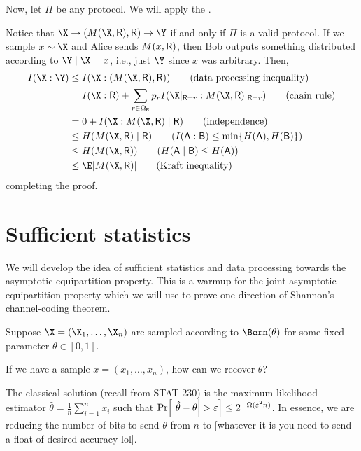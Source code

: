 \documentclass[class=co432,notes,tikz]{agony}
\begin{document}
\begin{prf}
  Now, let $\Pi$ be any protocol.
  We will apply the .

  Notice that $\X \to (M(\X,\rv R),\rv R) \to \Y$ if and only if $\Pi$
  is a valid protocol.
  If we sample $x\sim\X$ and Alice sends $M(x,\mathsf R)$,
  then Bob outputs something distributed according to $\Y \mid \X=x$,
  i.e., just $\Y$ since $x$ was arbitrary. Then,
  \begin{align*}
    I(\X : \Y)
     & \leq I(\X : (M(\X,\rv R),\rv R)) \tag{data processing inequality}                                          \\
     & = I(\X : \rv R) + \sum_{r\in\Omega_{\rv R}} p_r I(\X|_{\rv R=r} : M(\X,\rv R)|_{\rv R=r}) \tag{chain rule} \\
     & = 0 + I(\X : M(\X,\rv R) \mid \rv R) \tag{independence}                                                    \\
     & \leq H(M(\X,\rv R) \mid \rv R) \tag{$I(\rv A : \rv B) \leq \min\{H(\rv A),H(\rv B)\}$}                     \\
     & \leq H(M(\X,\rv R)) \tag{$H(\rv A \mid \rv B) \leq H(\rv A)$}                                              \\
     & \leq \E\abs{M(\X,\rv R)} \tag{Kraft inequality}
  \end{align*}
  completing the proof.
\end{prf}

\section{Sufficient statistics}\label{sec:ss}
We will develop the idea of sufficient statistics and data processing
towards the asymptotic equipartition property.
This is a warmup for the joint asymptotic equipartition property
which we will use to prove one direction of Shannon's channel-coding theorem.

\begin{problem}
  Suppose $\X = (\X_1,\dotsc,\X_n)$ are \iid sampled according to $\Bern(\theta)$
  for some fixed parameter $\theta \in [0,1]$.

  If we have a sample $x = (x_1,\dotsc,x_n)$, how can we recover $\theta$?
\end{problem}

The classical solution (recall from STAT 230) is the maximum likelihood estimator
$\hat\theta = \frac1n\sum_{i=1}^n x_i$ such that
$\Pr[\abs{\hat\theta-\theta} > \varepsilon] \leq 2^{-\Omega(\varepsilon^2n)}$.
In essence, we are reducing the number of bits to send $\theta$ from $n$
to [whatever it is you need to send a float of desired accuracy lol].
\end{document}
